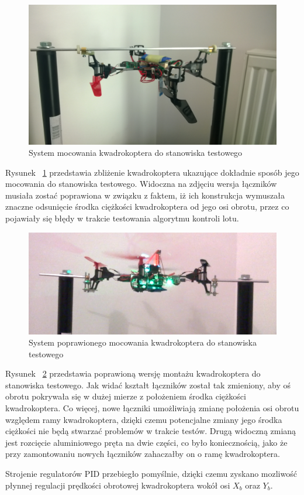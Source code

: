 \begin{figure}[H]
	\centering
	\includegraphics[scale=0.12]{Pictures/QuadroTestStationZoom.jpg}
	\caption[System mocowania kwadrokoptera do stanowiska testowego]{System mocowania kwadrokoptera do stanowiska testowego}
	\label{fig:QuadroTestStationZoom}
\end{figure}

Rysunek ~\ref{fig:QuadroTestStationZoom} przedstawia zbliżenie kwadrokoptera ukazujące dokładnie sposób jego mocowania do stanowiska testowego. Widoczna na zdjęciu wersja łączników musiała zostać poprawiona w związku z faktem, iż ich konstrukcja wymuszała znaczne odsunięcie środka ciężkości kwadrokoptera od jego osi obrotu, przez co pojawiały się błędy w trakcie testowania algorytmu kontroli lotu. 

\begin{figure}[H]
	\centering
	\includegraphics[scale=0.55]{Pictures/quadro_mont_poprawiony.png}
	\caption[System poprawionego mocowania kwadrokoptera do stanowiska testowego]{System poprawionego mocowania kwadrokoptera do stanowiska testowego}
	\label{fig:QuadroTestStationZoomPoprawiony}
\end{figure}

Rysunek ~\ref{fig:QuadroTestStationZoomPoprawiony} przedstawia poprawioną wersję montażu kwadrokoptera do stanowiska testowego. Jak widać kształt łączników został tak zmieniony, aby oś obrotu pokrywała się w dużej mierze z położeniem środka ciężkości kwadrokoptera. Co więcej, nowe łączniki umożliwiają zmianę położenia osi obrotu względem ramy kwadrokoptera, dzięki czemu potencjalne zmiany jego środka ciężkości nie będą stwarzać problemów w trakcie testów. Drugą widoczną zmianą jest rozcięcie aluminiowego pręta na dwie części, co było koniecznością, jako że przy zamontowaniu nowych łączników zahaczałby on o ramę kwadrokoptera.

Strojenie regulatorów PID przebiegło pomyślnie, dzięki czemu zyskano mozliwość płynnej regulacji prędkości obrotowej kwadrokoptera wokół osi $X_b$ oraz $Y_b$. 
